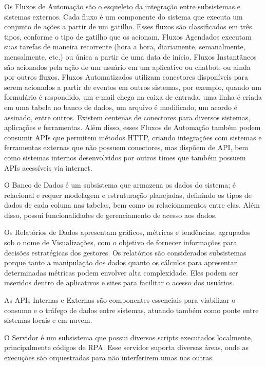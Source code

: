 	Os Fluxos de Automação são o esqueleto da integração entre subsistemas e sistemas externos. Cada fluxo é um componente do sistema que executa um conjunto de ações a partir de um gatilho. Esses fluxos são classificados em três tipos, conforme o tipo de gatilho que os acionam. Fluxos Agendados executam suas tarefas de maneira recorrente (hora a hora, diariamente, semanalmente, mensalmente, etc.) ou única a partir de uma data de início. Fluxos Instantâneos são acionados pela ação de um usuário em um aplicativo ou chatbot, ou ainda por outros fluxos. Fluxos Automatizados utilizam conectores disponíveis para serem acionados a partir de eventos em outros sistemas, por exemplo, quando um formulário é respondido, um e-mail chega na caixa de entrada, uma linha é criada em uma tabela no banco de dados, um arquivo é modificado, um acordo é assinado, entre outros. Existem centenas de conectores para diversos sistemas, aplicações e ferramentas. Além disso, esses Fluxos de Automação também podem consumir APIs que permitem métodos HTTP, criando integrações com sistemas e ferramentas externas que não possuem conectores, mas dispõem de API, bem como sistemas internos desenvolvidos por outros times que também possuem APIs acessíveis via internet.

	O Banco de Dados é um subsistema que armazena os dados do sistema; é relacional e requer modelagem e estruturação planejadas, definindo os tipos de dados de cada coluna nas tabelas, bem como os relacionamentos entre elas. Além disso, possui funcionalidades de gerenciamento de acesso aos dados.

	Os Relatórios de Dados apresentam gráficos, métricas e tendências, agrupados sob o nome de Visualizações, com o objetivo de fornecer informações para decisões estratégicas dos gestores. Os relatórios são considerados subsistemas porque tanto a manipulação dos dados quanto os cálculos para apresentar determinadas métricas podem envolver alta complexidade. Eles podem ser inseridos dentro de aplicativos e sites para facilitar o acesso dos usuários.

	As APIs Internas e Externas são componentes essenciais para viabilizar o consumo e o tráfego de dados entre sistemas, atuando também como ponte entre sistemas locais e em nuvem.

	O Servidor é um subsistema que possui diversos scripts executados localmente, principalmente códigos de RPA. Esse servidor suporta diversas áreas, onde as execuções são orquestradas para não interferirem umas nas outras.

